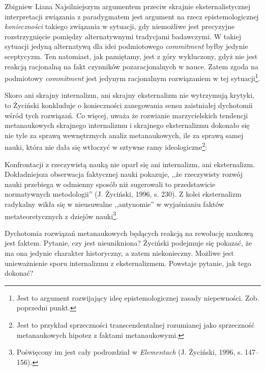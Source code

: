 \begin{artplenv}{Zbigniew Liana}
Najsilniejszym argumentem przeciw skrajnie eksternalistycznej interpretacji związania z paradygmatem jest argument na
rzecz epistemologicznej \textit{konieczności} takiego związania w sytuacji, gdy niemożliwe jest precyzyjne
rozstrzygnięcie pomiędzy alternatywnymi tradycjami badawczymi. W takiej sytuacji jedyną alternatywą dla idei
podmiotowego \textit{commitment} byłby jedynie sceptycyzm. Ten natomiast, jak pamiętamy, jest z góry wykluczony, gdyż nie
jest reakcją racjonalną na fakt czynników pozaracjonalnych w nauce. Zatem zgoda na podmiotowy \textit{commitment} jest
jedynym racjonalnym rozwiązaniem w tej sytuacji\footnote{Jest to argument rozwijający ideę epistemologicznej zasady
niepewności. Zob. poprzedni punkt. }.

Skoro ani skrajny internalizm, ani skrajny eksternalizm nie wytrzymują krytyki, to Życiński konkluduje o konieczności
zanegowania sensu zaistniałej dychotomii wśród tych rozwiązań. Co więcej, uważa że rozwianie marzycielskich tendencji
metanaukowych skrajnego internalizmu i skrajnego eksternalizmu dokonało się nie tyle za sprawą wewnętrznych analiz
metanaukowych, ile za sprawą samej nauki, która nie dała się wtłoczyć w sztywne ramy ideologiczne\footnote{Jest to
przykład sprzeczności transcendentalnej rozumianej jako sprzeczność metanaukowych hipotez z faktami metanaukowymi.}:


Konfrontacji z rzeczywistą nauką nie oparł się ani internalizm, ani eksternalizm. Dokładniejsza obserwacja faktycznej
nauki pokazuje, ,,że rzeczywisty rozwój nauki przebiega w odmienny sposób niż sugerowali to przedstawicie normatywnych
metodologii'' \label{ref:RNDWCF6lU0sbi}(J. Życiński, 1996, s. 230). Z kolei eksternalizm radykalny wikła
się w nieusuwalne ,,antynomie'' w wyjaśnianiu faktów metateoretycznych z dziejów nauki\footnote{Poświęcony im jest cały
podrozdział w \textit{Elementach} \label{ref:RNDrpsugHpH8D}(J. Życiński, 1996, s. 147–156).}.

Dychotomia rozwiązań metanaukowych będących reakcją na rewolucję naukową jest faktem. Pytanie, czy jest nieunikniona?
Życiński podejmuje się pokazać, że ma ona jedynie charakter historyczny, a zatem niekonieczny. Możliwe jest
unieważnienie sporu internalizmu z eksternalizmem. Powstaje pytanie, jak tego dokonać?


\end{artplenv}

